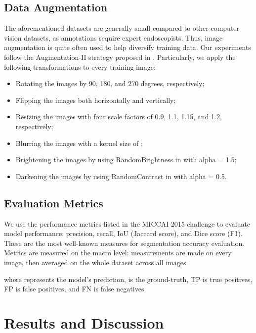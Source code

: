 \documentclass[review, sort&compress]{elsarticle}
\begin{document}
	\subsection{Data Augmentation}
	The aforementioned datasets are generally small compared to other computer vision datasets, as annotations require expert endoscopists. Thus, image augmentation is quite often used to help diversify training data. Our experiments follow the Augmentation-II strategy proposed in \cite{shin2018automatic}. Particularly, we apply the following transformations to every training image:
	\begin{itemize}
		\item Rotating the images by 90, 180, and 270 degrees, respectively;
		\item Flipping the images both horizontally and vertically;
		\item Resizing the images with four scale factors of 0.9, 1.1, 1.15, and 1.2, respectively;
		\item Blurring the images with a kernel size of ;
		\item Brightening the images by using RandomBrightness in \cite{albumentations} with alpha = 1.5;
		\item Darkening the images by using RandomContrast in \cite{albumentations} with alpha = 0.5.
	\end{itemize}
	
	\subsection{Evaluation Metrics}
	We use the performance metrics listed in the MICCAI 2015 challenge\cite{miccai_polyp} to evaluate model performance: precision, recall, IoU (Jaccard score), and Dice score (F1). These are the most well-known measures for segmentation accuracy evaluation. Metrics are measured on the macro level: measurements are made on every image, then averaged on the whole dataset across all images.	
	
	where  represents the model's prediction,  is the ground-truth, TP is true positives, FP is false positives, and FN is false negatives.
	
	\section{Results and Discussion}
	\label{sec:results}
\end{document}
